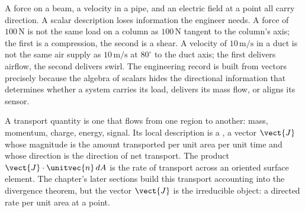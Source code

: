 A force on a beam, a velocity in a pipe, and an electric field at a
point all carry direction. A scalar description loses information the
engineer needs. A force of $100 \,\si{\newton}$ is not the same load
on a column as $100 \,\si{\newton}$ tangent to the column's axis; the
first is a compression, the second is a shear. A velocity of
$10 \,\si{\meter\per\second}$ in a duct is not the same air supply as
$10 \,\si{\meter\per\second}$ at $80^{\circ}$ to the duct axis; the
first delivers airflow, the second delivers swirl. The engineering
record is built from vectors precisely because the algebra of scalars
hides the directional information that determines whether a system
carries its load, delivers its mass flow, or aligns its sensor.

\begin{archetype}
A transport quantity is one that flows from one region to another:
mass, momentum, charge, energy, signal. Its local description is a
, a vector $\vect{J}$ whose magnitude is the
amount transported per unit area per unit time and whose direction is
the direction of net transport. The product $\vect{J} \cdot \unitvec{n}
\,dA$ is the rate of transport across an oriented surface element.
The chapter's later sections build this transport accounting into the
divergence theorem, but the vector $\vect{J}$ is the irreducible
object: a directed rate per unit area at a point.
\end{archetype}

